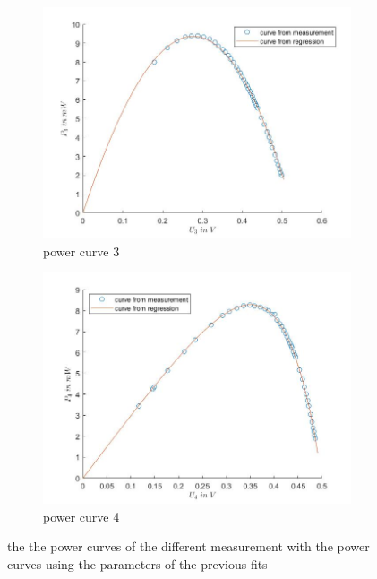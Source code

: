 \documentclass[a4paper, 12pt]{scrartcl}
\begin{document}
\begin{figure}[H]
\begin{adjustwidth}{-1em}{7em}
  \begin{subfigure}[b]{0.5\textwidth}
    \includegraphics[width=\textwidth]{P3}
    \caption{power curve 3}
    \label{fig:}
  \end{subfigure}
  \begin{subfigure}[b]{0.5\textwidth}
    \includegraphics[width=\textwidth]{P4}
    \caption{power curve 4}
    \label{fig:}
  \end{subfigure}
\end{adjustwidth}
\caption{the the power curves of the different measurement with the power curves using the parameters of the previous fits}
\end{figure}
\end{document}
